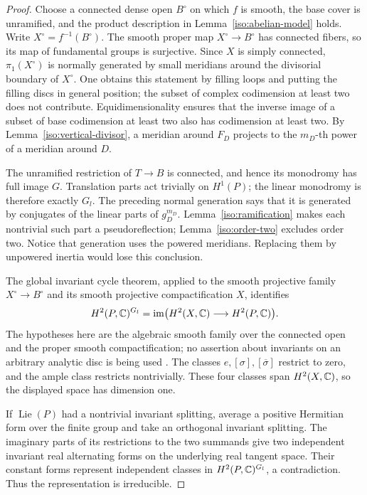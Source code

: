 \begin{proof}
Choose a connected dense open \(B^\circ\) on which \(f\) is smooth,
the base cover is unramified, and the product description in
Lemma~\ref{iso:abelian-model} holds.  Write \(X^\circ=f^{-1}(B^\circ)\).
The smooth proper map \(X^\circ\to B^\circ\) has connected fibers,
so its map of fundamental groups is surjective.
Since \(X\) is simply connected,
\(\pi_1(X^\circ)\) is normally generated by small meridians around
the divisorial boundary of \(X^\circ\).  One obtains this statement
by filling loops and putting the filling discs in general position;
the subset of complex codimension at least two does not contribute.
Equidimensionality ensures that the inverse image of a subset of
base codimension at least two also has codimension at least two.
By Lemma~\ref{iso:vertical-divisor}, a meridian around \(F_D\)
projects to the \(m_D\)-th power of a meridian around \(D\).

The unramified restriction of \(T\to B\) is connected, and hence its
monodromy has full image \(G\).
Translation parts act trivially on \(H^1(P)\); the linear monodromy
is therefore exactly \(G_l\).
The preceding normal generation says that it is generated by
conjugates of the linear parts of \(g_D^{m_D}\).
Lemma~\ref{iso:ramification} makes each nontrivial such part a
pseudoreflection; Lemma~\ref{iso:order-two} excludes order two.
Notice that generation uses the powered meridians.  Replacing
them by unpowered inertia would lose this conclusion.

The global invariant cycle theorem, applied to the smooth projective
family \(X^\circ\to B^\circ\) and its smooth projective compactification
\(X\), identifies
\[
       H^2(P,\mathbb C)^{G_l}
       =\operatorname{im}\bigl(H^2(X,\mathbb C)\longrightarrow H^2(P,\mathbb C)\bigr).
\]
The hypotheses here are the algebraic smooth family over the connected
open and the proper smooth compactification; no assertion about
invariants on an arbitrary analytic disc is being used
\cite[Th\'eor\`eme~4.1.1(ii)]{Deligne1971}.
The classes \(e,[\sigma],[\overline\sigma]\) restrict to zero,
and the ample class restricts nontrivially.
These four classes span \(H^2(X,\mathbb C)\), so the displayed space has
dimension one.

If \(\operatorname{Lie}(P)\) had a nontrivial invariant splitting,
average a positive Hermitian form over the finite group and take an
orthogonal invariant splitting.  The imaginary parts of its
restrictions to the two summands give two independent invariant
real alternating forms on the underlying real tangent space.
Their constant forms represent independent classes in
\(H^2(P,\mathbb C)^{G_l}\), a contradiction.  Thus the representation is
irreducible.


\end{proof}
